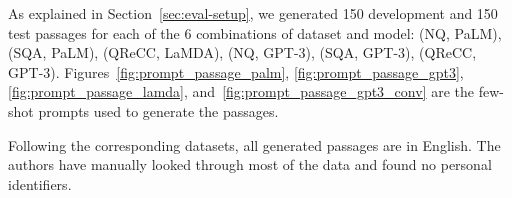 As explained in Section~\ref{sec:eval-setup}, we generated 150 development and 150 test passages for each of the 6 combinations of dataset and model: (NQ, PaLM), (SQA, PaLM), (QReCC, LaMDA), (NQ, GPT-3), (SQA, GPT-3), (QReCC, GPT-3).
Figures~\ref{fig:prompt_passage_palm}, \ref{fig:prompt_passage_gpt3}, \ref{fig:prompt_passage_lamda},  and~\ref{fig:prompt_passage_gpt3_conv} are the few-shot prompts used to generate the passages.

Following the corresponding datasets, all generated passages are in English. The authors have manually looked through most of the data and found no personal identifiers.




